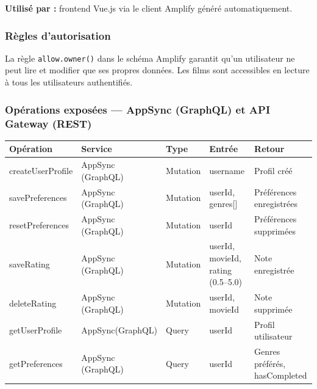 \documentclass[a4paper,12pt]{report}
\begin{document}
\textbf{Utilisé par :} frontend Vue.js via le client Amplify généré automatiquement.

\subsubsection{Règles d'autorisation}

La règle \texttt{allow.owner()} dans le schéma Amplify garantit qu'un utilisateur ne peut lire et modifier que ses propres données. Les films sont accessibles en lecture à tous les utilisateurs authentifiés.
\newpage
\subsubsection{Opérations exposées — AppSync (GraphQL) et API Gateway (REST)}


\begin{table}[htbp]
\centering
\begin{tabular}{p{3cm} p{3cm} p{2cm} p{3.5cm} p{4cm}}
\toprule
\textbf{Opération} & \textbf{Service} & \textbf{Type} & \textbf{Entrée} & \textbf{Retour} \\
\midrule

createUserProfile & AppSync \newline (GraphQL) & Mutation & username & Profil créé \\

savePreferences & AppSync \newline(GraphQL) & Mutation & userId, genres[] & Préférences enregistrées \\

resetPreferences & AppSync \newline(GraphQL) & Mutation & userId & Préférences supprimées \\

saveRating & AppSync \newline (GraphQL) & Mutation & userId, movieId, rating (0.5--5.0) & Note enregistrée \\

deleteRating & AppSync \newline(GraphQL) & Mutation & userId, movieId & Note supprimée \\

getUserProfile & AppSync\newline (GraphQL) & Query & userId & Profil utilisateur \\

getPreferences & AppSync \newline(GraphQL) & Query & userId & Genres préférés, hasCompleted \\


\end{tabular}
\end{table}
\end{document}
